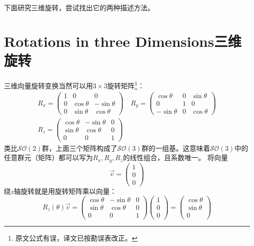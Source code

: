 下面研究三维旋转，尝试找出它的两种描述方法。

\section[三维旋转]{Rotations in three Dimensions\quad 三维旋转}
\label{sec3.3}
三维向量旋转变换当然可以用$3 \times 3$旋转矩阵\footnote{原文公式有误，译文已按勘误表改正。}：
\begin{align}
R_x =
	\begin{pmatrix}
		1 & 0 & 0 \\
		0 & \cos \theta & -\sin \theta \\
		0 & \sin \theta & \cos \theta
	\end{pmatrix}
\quad
R_y =
	\begin{pmatrix}
		\cos \theta & 0 & \sin \theta \\
		0 & 1 & 0 \\
		-\sin \theta & 0 & \cos \theta
	\end{pmatrix}
\nonumber \\
\label{equ3.23}
R_z =
	\begin{pmatrix}
		\cos \theta & -\sin \theta & 0 \\
		\sin \theta & \cos \theta & 0 \\
		0 & 0 & 1
	\end{pmatrix}
\end{align}
类比$\mathcal{SO}(2)$群，上面三个矩阵构成了$\mathcal{SO}(3)$群的一组基。这意味着$\mathcal{SO}(3)$中的任意群元（矩阵）都可以写为$R_x, R_y, R_z$的线性组合，且系数唯一。
将向量
\begin{equation*}
\vec{v} = \begin{pmatrix}
			1 \\ 0 \\ 0
		\end{pmatrix}
\end{equation*}
绕$z$轴旋转就是用旋转矩阵乘以向量：
\begin{equation}
\label{equ3.24}
R_z(\theta) \vec{v} =
	\begin{pmatrix}
		\cos \theta & -\sin \theta & 0 \\
		\sin \theta & \cos \theta & 0 \\
		0 & 0 & 1
	\end{pmatrix}
	\begin{pmatrix}
		1 \\ 0 \\ 0
	\end{pmatrix}
=
	\begin{pmatrix}
		\cos \theta \\ \sin \theta \\ 0
	\end{pmatrix}
\end{equation}
